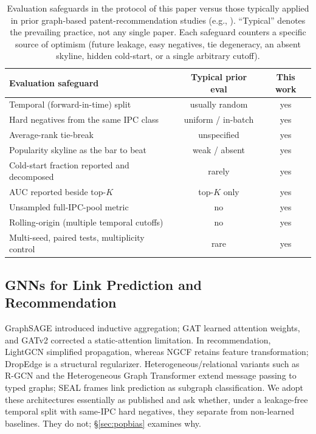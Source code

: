 \documentclass[preprint,12pt]{elsarticle}
\begin{document}
\begin{table}[t]
\centering
\caption{Evaluation safeguards in the protocol of this paper versus those typically
applied in prior graph-based patent-recommendation studies (e.g.,
\cite{kim2025,chendeng2023,liu2024}). ``Typical'' denotes the prevailing practice, not
any single paper. Each safeguard counters a specific source of optimism (future
leakage, easy negatives, tie degeneracy, an absent skyline, hidden cold-start, or a
single arbitrary cutoff).}
\label{tab:protocol}
\begin{tabular}{lcc}
\toprule
Evaluation safeguard & Typical prior eval & This work \\
\midrule
Temporal (forward-in-time) split            & usually random   & yes \\
Hard negatives from the same IPC class       & uniform / in-batch & yes \\
Average-rank tie-break                        & unspecified      & yes \\
Popularity skyline as the bar to beat         & weak / absent    & yes \\
Cold-start fraction reported and decomposed   & rarely           & yes \\
AUC reported beside top-$K$                    & top-$K$ only     & yes \\
Unsampled full-IPC-pool metric                & no               & yes \\
Rolling-origin (multiple temporal cutoffs)     & no               & yes \\
Multi-seed, paired tests, multiplicity control & rare             & yes \\
\bottomrule
\end{tabular}
\end{table}

\subsection{GNNs for Link Prediction and Recommendation}
GraphSAGE \cite{hamilton2017} introduced inductive aggregation; GAT \cite{velickovic2018}
learned attention weights, and GATv2 \cite{brody2022} corrected a static-attention
limitation. In recommendation, LightGCN \cite{he2020} simplified propagation, whereas
NGCF \cite{wang2019} retains feature transformation; DropEdge \cite{rong2020} is a
structural regularizer. Heterogeneous/relational variants such as R-GCN
\cite{schlichtkrull2018} and the Heterogeneous Graph Transformer \cite{hu2020hgt}
extend message passing to typed graphs; SEAL \cite{zhang2018} frames link prediction
as subgraph classification. We adopt these architectures essentially as published and
ask whether, under a leakage-free temporal split with same-IPC hard negatives, they
separate from non-learned baselines. They do not; \S\ref{sec:popbias} examines why.
\end{document}
